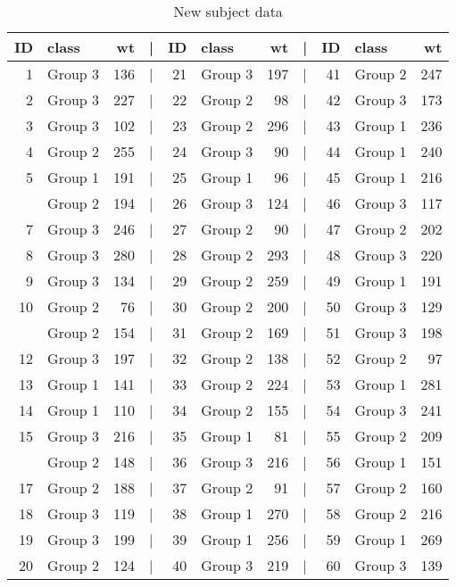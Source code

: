 \documentclass[smallextended]{svjour3}       %
\begin{document}
\begin{table}

\caption{\label{tab:new-data}New subject data}
\centering
\begin{tabular}[t]{rlrlrlrlrlr}
\toprule
ID & class & wt & | & ID & class & wt & | & ID & class & wt\\
\midrule
1 & Group 3 & 136 & | & 21 & Group 3 & 197 & | & 41 & Group 2 & 247\\
2 & Group 3 & 227 & | & 22 & Group 2 & 98 & | & 42 & Group 3 & 173\\
3 & Group 3 & 102 & | & 23 & Group 2 & 296 & | & 43 & Group 1 & 236\\
4 & Group 2 & 255 & | & 24 & Group 3 & 90 & | & 44 & Group 1 & 240\\
5 & Group 1 & 191 & | & 25 & Group 1 & 96 & | & 45 & Group 1 & 216\\
\addlinespace
6 & Group 2 & 194 & | & 26 & Group 3 & 124 & | & 46 & Group 3 & 117\\
7 & Group 3 & 246 & | & 27 & Group 2 & 90 & | & 47 & Group 2 & 202\\
8 & Group 3 & 280 & | & 28 & Group 2 & 293 & | & 48 & Group 3 & 220\\
9 & Group 3 & 134 & | & 29 & Group 2 & 259 & | & 49 & Group 1 & 191\\
10 & Group 2 & 76 & | & 30 & Group 2 & 200 & | & 50 & Group 3 & 129\\
\addlinespace
11 & Group 2 & 154 & | & 31 & Group 2 & 169 & | & 51 & Group 3 & 198\\
12 & Group 3 & 197 & | & 32 & Group 2 & 138 & | & 52 & Group 2 & 97\\
13 & Group 1 & 141 & | & 33 & Group 2 & 224 & | & 53 & Group 1 & 281\\
14 & Group 1 & 110 & | & 34 & Group 2 & 155 & | & 54 & Group 3 & 241\\
15 & Group 3 & 216 & | & 35 & Group 1 & 81 & | & 55 & Group 2 & 209\\
\addlinespace
16 & Group 2 & 148 & | & 36 & Group 3 & 216 & | & 56 & Group 1 & 151\\
17 & Group 2 & 188 & | & 37 & Group 2 & 91 & | & 57 & Group 2 & 160\\
18 & Group 3 & 119 & | & 38 & Group 1 & 270 & | & 58 & Group 2 & 216\\
19 & Group 3 & 199 & | & 39 & Group 1 & 256 & | & 59 & Group 1 & 269\\
20 & Group 2 & 124 & | & 40 & Group 3 & 219 & | & 60 & Group 3 & 139\\
\bottomrule
\end{tabular}
\end{table}
\end{document}
